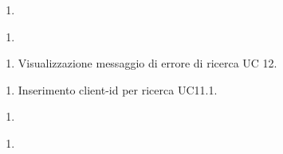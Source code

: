 \begin{usecase}{}{}\label{uc:}
    \usecasepre{}
    \usecasedesc{}
    \usecasepost{}

    \usecasemain{}
        \begin{enumerate}
            \item 
        \end{enumerate}

\end{usecase}


\begin{usecase}{}{}\label{uc:}
    \usecasepre{}
    \usecasedesc{}
    \usecasepost{}

    \usecasemain{}
        \begin{enumerate}
            \item 
        \end{enumerate}

    \usecaseext{}
        \begin{enumerate}
            \item Visualizzazione messaggio di errore di ricerca UC 12.
        \end{enumerate}

    \usecasegen{}
        \begin{enumerate}
            \item Inserimento client-id per ricerca UC11.1.
        \end{enumerate}

\end{usecase}


\begin{usecase}{}{}\label{uc:}
    \usecasepre{}
    \usecasedesc{}
    \usecasepost{}

    \usecasemain{}
        \begin{enumerate}
            \item 
        \end{enumerate}

\end{usecase}


\begin{usecase}{}{}\label{uc:}
    \usecasepre{}
    \usecasedesc{}
    \usecasepost{}

    \usecasemain{}
        \begin{enumerate}
            \item 
        \end{enumerate}

\end{usecase}


